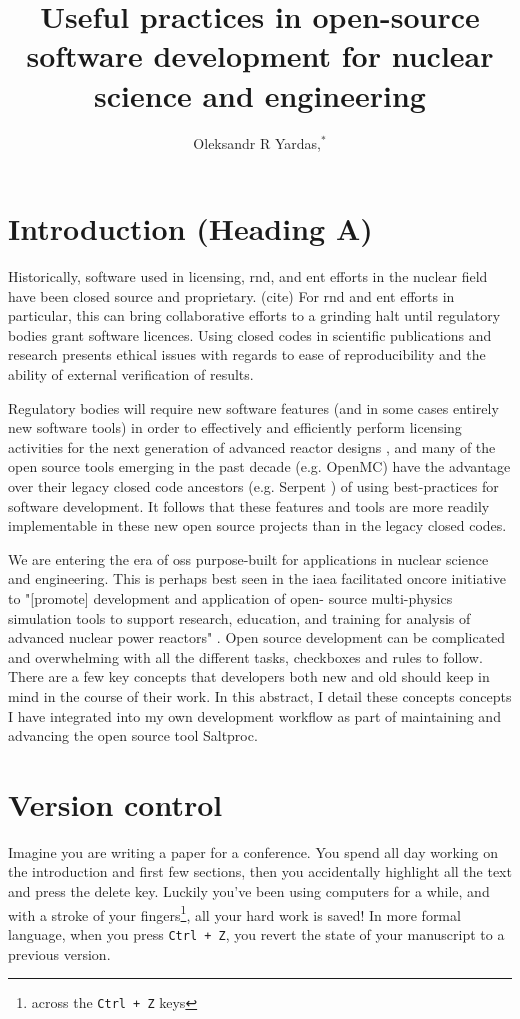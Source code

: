 \documentclass{anstrans}
\title{Useful practices in open-source software development for nuclear science and engineering}
\author{Oleksandr R Yardas,$^{*}$}
\institute{
$^{*}$Advanced Reactors and Fuel Cycles, University of Illinois - Urbana Champaign.
Champaign, IL, oyardas2@illinois.edu
}
\begin{document}
\section{Introduction (Heading A)}
    Historically, software used in licensing, \Gls{rnd}, and \Gls{ent} efforts in the nuclear field have been closed source and proprietary. (cite) For \Gls{rnd} and \Gls{ent} efforts in particular, this can bring collaborative efforts to a grinding halt until regulatory bodies grant software licences. Using closed codes in scientific publications and research presents ethical issues with regards to ease of reproducibility and the ability of external verification of results.
    
    Regulatory bodies will require new software features (and in some cases entirely new software tools) in order to effectively and efficiently perform licensing activities for the next generation of advanced reactor designs \cite{usnrc_nonlwr_2020-1}, and many of the open source tools emerging in the past decade (e.g. OpenMC\cite{romano_openmc_2015}) have the advantage over their legacy closed code ancestors (e.g. Serpent \cite{leppanen_serpent_2014}) of using best-practices for software development. It follows that these features and tools are more readily implementable in these new open source projects than in the legacy closed codes.
    
    We are entering the era of \Gls{oss} purpose-built for applications in nuclear science and engineering. This is perhaps best seen in the \Gls{iaea} facilitated \Gls{oncore} initiative \cite{fiorina_initiative_2021} to "[promote] development and application of open- source multi-physics simulation tools to support research, education, and training for analysis of advanced nuclear power reactors"  \cite{iaea_open-source}. Open source development can be complicated and overwhelming with all the different tasks, checkboxes and rules to follow. There are a few key concepts that developers both new and old should keep in mind in the course of their work. In this abstract, I detail these concepts concepts I have integrated into my own development workflow as part of maintaining and advancing the open source tool Saltproc\cite{rykhlevskii_saltproc_2018}.

\section{Version control}
    Imagine you are writing a paper for a conference. You spend all day working on the introduction and first few sections, then you accidentally highlight all the text and press the delete key. Luckily you've been using computers for a while, and with a stroke of your fingers\footnote{across the \verb.Ctrl + Z. keys}, all your hard work is saved! In more formal language, when you press \verb.Ctrl + Z., you revert the state of your manuscript to a previous version.
    
\end{document}
